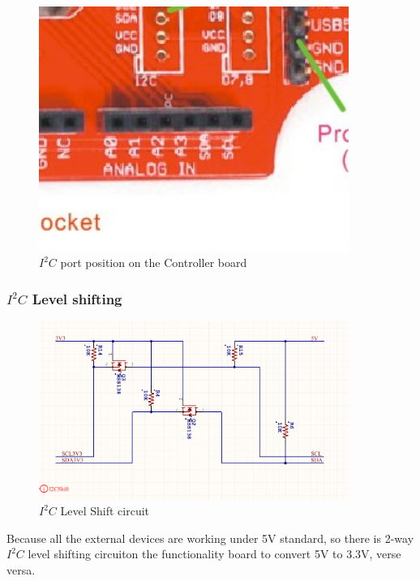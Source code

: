    \begin{figure}[H]
    \centering
    \includegraphics[width=0.9\textwidth]{i2cPort.png}
    \caption{\label{fig:i2c Port}$I^{2}C$ port position on the Controller board}
    \end{figure}

    \subsubsection{$I^{2}C$ Level shifting}
    \begin{figure}[H]
    \centering
    \includegraphics[width=0.9\textwidth]{i2clevelshift.png}
    \caption{\label{fig:i2c Level shift}$I^{2}C$ Level Shift circuit}
    \end{figure}
    Because all the external devices are working under 5V standard, so there is 2-way $I^{2}C$ level shifting circuit\footnotemark on the functionality board to convert 5V to 3.3V, verse versa.


